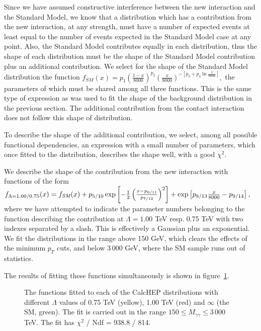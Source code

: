 Since we have assumed constructive interference between the new interaction and the Standard Model, we know that a distribution which has a contribution from the new interaction, at any strength, must have a number of expected events at least equal to the number of events expected in the Standard Model case at any point. Also, the Standard Model contributes equally in each distribution, thus the shape of each distribution must be the shape of the Standard Model contribution plus an additional contribution. We select for the shape of the Standard Model distribution the function
\(f_\textit{SM}(x)=p_1\left(\frac{1-x}{8000}\right)^{p_2}\left(\frac{x}{8000}\right)^{-\left[p_3+p_4\ln\frac{x}{8000}\right]},\)
the parameters of which must be shared among all three functions. This is the same type of expression as was used to fit the shape of the background distribution in the previous section. The additional contribution from the contact interaction does not follow this shape of distribution.
\begin{edit}
To describe the shape of the additional contribution, we select, among all possible functional dependencies, an expression with a small number of parameters, which once fitted to the distribution, describes the shape well, with a good $\chi^2$.
\end{edit}

We describe the shape of the contribution from the new interaction with functions of the form
\(f_{\Lambda=1.00/0.75}(x)=f_\textit{SM}(x)+p_{5/10}\exp\left[-\frac{1}{2}\left(\frac{x-p_{6/11}}{p_{7/12}}\right)^2\right]+\exp\left[p_{8/13}\frac{x}{8000}-p_{9/14}\right],\)
where we have attempted to indicate the parameter numbers belonging to the function describing the contribution at $\Lambda=1.00$ TeV resp. 0.75 TeV with two indexes separated by a slash. This is effectively a Gaussian plus an exponential. We fit the distributions in the range above 150 GeV, which clears the effects of the minimum $p_T$ cuts, and below 3\,000 GeV, where the SM sample runs out of statistics.

The results of fitting these functions simultaneously is shown in figure~\ref{simfit}.


\begin{figure}[hbt]
\begin{infilsf}\tiny

\end{infilsf}
\caption{The functions fitted to each of the CalcHEP distributions with different $\Lambda$ values of 0.75 TeV (yellow), 1.00 TeV (red) and $\infty$ (the SM, green). The fit is carried out in the range $150 \le M_{\gamma\gamma} \le 3\,000$ TeV. The fit has $\chi^2$ / Ndf = 938.8 / 814.}\label{simfit}
\end{figure}

